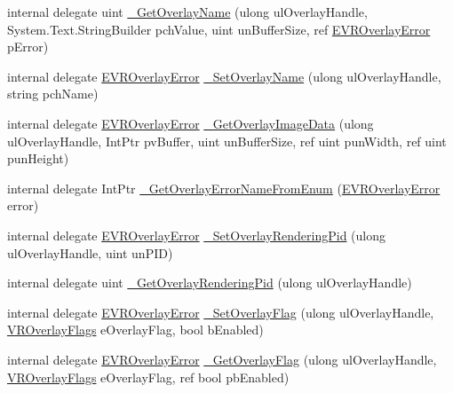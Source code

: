 \begin{DoxyCompactItemize}
internal delegate uint \mbox{\hyperlink{struct_valve_1_1_v_r_1_1_i_v_r_overlay_ac81c5dd576fe54477b02122fbad65a6b}{\+\_\+\+Get\+Overlay\+Name}} (ulong ul\+Overlay\+Handle, System.\+Text.\+String\+Builder pch\+Value, uint un\+Buffer\+Size, ref \mbox{\hyperlink{namespace_valve_1_1_v_r_aaee5c5144f42b7969d45b854f51b0c18}{E\+V\+R\+Overlay\+Error}} p\+Error)
\item 
internal delegate \mbox{\hyperlink{namespace_valve_1_1_v_r_aaee5c5144f42b7969d45b854f51b0c18}{E\+V\+R\+Overlay\+Error}} \mbox{\hyperlink{struct_valve_1_1_v_r_1_1_i_v_r_overlay_a465fcf8a1450d69d7e1e4f26117069fe}{\+\_\+\+Set\+Overlay\+Name}} (ulong ul\+Overlay\+Handle, string pch\+Name)
\item 
internal delegate \mbox{\hyperlink{namespace_valve_1_1_v_r_aaee5c5144f42b7969d45b854f51b0c18}{E\+V\+R\+Overlay\+Error}} \mbox{\hyperlink{struct_valve_1_1_v_r_1_1_i_v_r_overlay_a871e10fd2136e1cfe17cab1e20aa3832}{\+\_\+\+Get\+Overlay\+Image\+Data}} (ulong ul\+Overlay\+Handle, Int\+Ptr pv\+Buffer, uint un\+Buffer\+Size, ref uint pun\+Width, ref uint pun\+Height)
\item 
internal delegate Int\+Ptr \mbox{\hyperlink{struct_valve_1_1_v_r_1_1_i_v_r_overlay_a55f8c3483bb8a333ac58781e174bde62}{\+\_\+\+Get\+Overlay\+Error\+Name\+From\+Enum}} (\mbox{\hyperlink{namespace_valve_1_1_v_r_aaee5c5144f42b7969d45b854f51b0c18}{E\+V\+R\+Overlay\+Error}} error)
\item 
internal delegate \mbox{\hyperlink{namespace_valve_1_1_v_r_aaee5c5144f42b7969d45b854f51b0c18}{E\+V\+R\+Overlay\+Error}} \mbox{\hyperlink{struct_valve_1_1_v_r_1_1_i_v_r_overlay_a8f638ca89f20888242e2232fd3e0c0e2}{\+\_\+\+Set\+Overlay\+Rendering\+Pid}} (ulong ul\+Overlay\+Handle, uint un\+P\+ID)
\item 
internal delegate uint \mbox{\hyperlink{struct_valve_1_1_v_r_1_1_i_v_r_overlay_a3d5ff014664a9f79caa2c148682a6d30}{\+\_\+\+Get\+Overlay\+Rendering\+Pid}} (ulong ul\+Overlay\+Handle)
\item 
internal delegate \mbox{\hyperlink{namespace_valve_1_1_v_r_aaee5c5144f42b7969d45b854f51b0c18}{E\+V\+R\+Overlay\+Error}} \mbox{\hyperlink{struct_valve_1_1_v_r_1_1_i_v_r_overlay_a4640d4e761c851e4673dbabf21915b14}{\+\_\+\+Set\+Overlay\+Flag}} (ulong ul\+Overlay\+Handle, \mbox{\hyperlink{namespace_valve_1_1_v_r_a34c8e00ad63b95c5f533b1387bcab6ff}{V\+R\+Overlay\+Flags}} e\+Overlay\+Flag, bool b\+Enabled)
\item 
internal delegate \mbox{\hyperlink{namespace_valve_1_1_v_r_aaee5c5144f42b7969d45b854f51b0c18}{E\+V\+R\+Overlay\+Error}} \mbox{\hyperlink{struct_valve_1_1_v_r_1_1_i_v_r_overlay_ae8d49da4f9a47a988edc9492f9e92831}{\+\_\+\+Get\+Overlay\+Flag}} (ulong ul\+Overlay\+Handle, \mbox{\hyperlink{namespace_valve_1_1_v_r_a34c8e00ad63b95c5f533b1387bcab6ff}{V\+R\+Overlay\+Flags}} e\+Overlay\+Flag, ref bool pb\+Enabled)

\end{DoxyCompactItemize}
